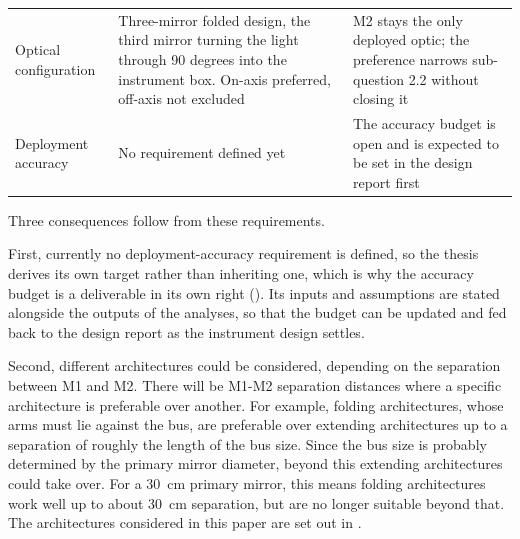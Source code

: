 \begin{table}[H]
\begin{tabularx}{\textwidth}{lXX}
        Optical configuration & Three-mirror folded design, the third mirror turning the light through 90 degrees into the instrument box. On-axis preferred, off-axis not excluded & M2 stays the only deployed optic; the preference narrows sub-question 2.2 without closing it \\
        \addlinespace
        
        Deployment accuracy & No requirement defined yet & The accuracy budget is open and is expected to be set in the design report first \\
        \bottomrule
    \end{tabularx}
\end{table}

Three consequences follow from these requirements.

First, currently no deployment-accuracy requirement is defined, so the thesis derives its own target rather than inheriting one, which is why the accuracy budget is a deliverable in its own right (). Its inputs and assumptions are stated alongside the outputs of the analyses, so that the budget can be updated and fed back to the design report as the instrument design settles.

Second, different architectures could be considered, depending on the separation between M1 and M2. There will be M1-M2 separation distances where a specific architecture is preferable over another. For example, folding architectures, whose arms must lie against the bus, are preferable over extending architectures up to a separation of roughly the length of the bus size. Since the bus size is probably determined by the primary mirror diameter, beyond this extending architectures could take over. For a \SI{30}{\centi\meter} primary mirror, this means folding architectures work well up to about \SI{30}{\centi\meter} separation, but are no longer suitable beyond that. The architectures considered in this paper are set out in .

